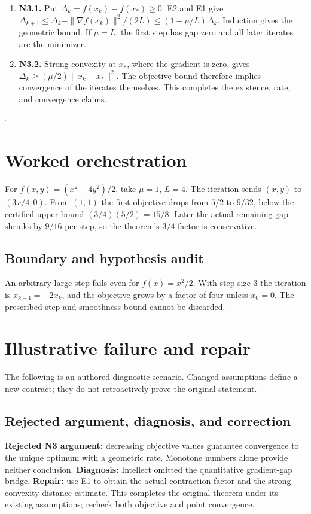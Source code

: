 \documentclass[preprint,12pt,aps,pra,showkeys,amsmath,amssymb,superscriptaddress,floatfix]{revtex4-2}
\theoremstyle{definition}
\theoremstyle{remark}
\begin{document}
\begin{enumerate}
\def\labelenumi{\arabic{enumi}.}
\item
  \textbf{N3.1.} Put \(\Delta_k=f(x_k)-f(x_*)\ge0\). E2 and E1 give
  \(\Delta_{k+1}\le\Delta_k-\|\nabla f(x_k)\|^2/(2L)\le(1-\mu/L)\Delta_k\).
  Induction gives the geometric bound. If \(\mu=L\), the first step has
  gap zero and all later iterates are the minimizer.
\item
  \textbf{N3.2.} Strong convexity at \(x_*\), where the gradient is
  zero, gives \(\Delta_k\ge(\mu/2)\|x_k-x_*\|^2\). The objective bound
  therefore implies convergence of the iterates themselves. This
  completes the existence, rate, and convergence claims.
\end{enumerate}

\hfill$\square$

\section{Worked orchestration}

For \(f(x,y)=(x^2+4y^2)/2\), take \(\mu=1\), \(L=4\). The iteration
sends \((x,y)\) to \((3x/4,0)\). From \((1,1)\) the first objective
drops from \(5/2\) to \(9/32\), below the certified upper bound
\((3/4)(5/2)=15/8\). Later the actual remaining gap shrinks by \(9/16\)
per step, so the theorem's \(3/4\) factor is conservative.

\subsection{Boundary and hypothesis audit}

An arbitrary large step fails even for \(f(x)=x^2/2\). With step size
\(3\) the iteration is \(x_{k+1}=-2x_k\), and the objective grows by a
factor of four unless \(x_0=0\). The prescribed step and smoothness
bound cannot be discarded.

\section{Illustrative failure and repair}

The following is an authored diagnostic scenario. Changed assumptions
define a new contract; they do not retroactively prove the original
statement.

\subsection{Rejected argument, diagnosis, and correction}
\textbf{Rejected N3 argument:} decreasing objective values guarantee
convergence to the unique optimum with a geometric rate. Monotone
numbers alone provide neither conclusion. \textbf{Diagnosis:} Intellect
omitted the quantitative gradient-gap bridge. \textbf{Repair:} use E1 to
obtain the actual contraction factor and the strong-convexity distance
estimate. This completes the original theorem under its existing
assumptions; recheck both objective and point convergence.
\end{document}
